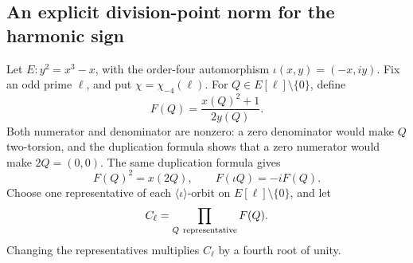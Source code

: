 \subsection{An explicit division-point norm for the harmonic sign}

Let \(E:y^2=x^3-x\), with the order-four automorphism
\(\iota(x,y)=(-x,iy)\). Fix an odd prime \(\ell\), and put
\(\chi=\chi_{-4}(\ell)\).
For \(Q\in E[\ell]\setminus\{0\}\), define
\[
        F(Q)=\frac{x(Q)^2+1}{2y(Q)}.
\]
Both numerator and denominator are nonzero: a zero denominator
would make \(Q\) two-torsion, and the duplication formula shows
that a zero numerator would make \(2Q=(0,0)\).
The same duplication formula gives
\begin{equation}\label{eq:gaussian-norm-function}
       F(Q)^2=x(2Q),\qquad F(\iota Q)=-iF(Q).
\end{equation}
Choose one representative of each \(\langle\iota\rangle\)-orbit
on \(E[\ell]\setminus\{0\}\), and let
\[
       C_\ell=\prod_{Q\ {\rm representative}}F(Q).
\]
Changing the representatives multiplies \(C_\ell\) by a fourth
root of unity.

